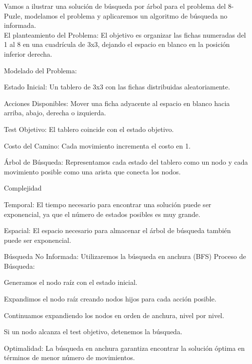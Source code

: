 \noindent Vamos a ilustrar una solución de búsqueda por árbol para el problema del 8-Puzle,
modelamos el problema y aplicaremos un algoritmo de búsqueda no informada.\\ 

\noindent El planteamiento del Problema: El objetivo es organizar las fichas numeradas
del 1 al 8 en una cuadrícula de 3x3, dejando el espacio en blanco en la posición inferior derecha.

\noindent Modelado del Problema:

\begin{myitemize} 
    \item Estado Inicial: Un tablero de 3x3 con las fichas distribuidas aleatoriamente.
    \item Acciones Disponibles: Mover una ficha adyacente al espacio en blanco hacia arriba, abajo, 
            derecha o izquierda.
    \item Test Objetivo: El tablero coincide con el estado objetivo.
    \item Costo del Camino: Cada movimiento incrementa el costo en 1.
\end{myitemize}

Árbol de Búsqueda: Representamos cada estado del tablero como un nodo y cada movimiento posible como una 
arista que conecta los nodos.
\begin{myitemize} 
    \item[] Complejidad
    \begin{myitemize} 
        \item Temporal: El tiempo necesario para encontrar una solución puede ser exponencial, ya que el 
                número de estados posibles es muy grande.
        \item Espacial: El espacio necesario para almacenar el árbol de búsqueda también puede 
                ser exponencial.
    \end{myitemize}

    \item[] Búsqueda No Informada: Utilizaremos la búsqueda en anchura (BFS) Proceso de Búsqueda:
    \begin{myitemize} 
        \item Generamos el nodo raíz con el estado inicial.
        \item Expandimos el nodo raíz creando nodos hijos para cada acción posible.
        \item Continuamos expandiendo los nodos en orden de anchura, nivel por nivel.
        \item Si un nodo alcanza el test objetivo, detenemos la búsqueda.
    \end{myitemize}    

    \item[] Optimalidad: La búsqueda en anchura garantiza encontrar la solución óptima en términos de 
            menor número de movimientos.
\end{myitemize}


